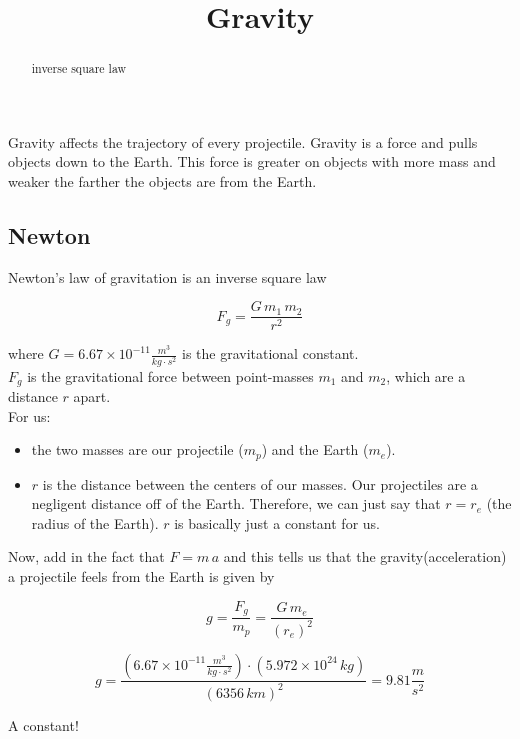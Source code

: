\documentclass{ximera}
\title{Gravity}
\begin{document}
\begin{abstract}
inverse square law
\end{abstract}
\maketitle




Gravity affects the trajectory of every projectile.  Gravity is a force and pulls objects down to the Earth. This force is greater on objects with more mass and weaker the farther the objects are from the Earth.




\subsection*{Newton}

Newton's law of gravitation is an inverse square law

\[ F_g = \frac{G \, m_1 \, m_2}{r^2}    \]




where $G = 6.67 \times 10^{-11} \frac{m^3}{kg \cdot s^2}$ is the gravitational constant. \\


$F_g$ is the gravitational force between point-masses $m_1$ and $m_2$, which are a distance $r$ apart. \\


For us:
\begin{itemize}
\item the two masses are our projectile ($m_p$) and the Earth ($m_e$).
\item $r$ is the distance between the centers of our masses. Our projectiles are a negligent distance off of the Earth.  Therefore, we can just say that $r = r_e$ (the radius of the Earth).  $r$ is basically just a constant for us.
\end{itemize}



Now, add in the fact that $F = m \, a$ and this tells us that the gravity(acceleration) a projectile feels from the Earth is given by


\[ g = \frac{F_g}{m_p}  = \frac{G \, m_e}{(r_e)^2}    \]


\[ g = \frac{(6.67 \times 10^{-11} \frac{m^3}{kg \cdot s^2}) \cdot (5.972 \times 10^{24} \, kg)}{(6356 \, km)^2} = 9.81 \frac{m}{s^2}   \]


A constant! \\
\end{document}
